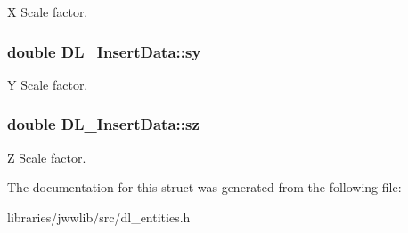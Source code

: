 X Scale factor. \hypertarget{structDL__InsertData_a163d354ac49b3c0d9c8b662dbdb8e714}{
\subsubsection[{sy}]{\setlength{\rightskip}{0pt plus 5cm}double D\-L\-\_\-\-Insert\-Data\-::sy}}\label{structDL__InsertData_a163d354ac49b3c0d9c8b662dbdb8e714}
Y Scale factor. \hypertarget{structDL__InsertData_a1327793a622ab705f4f09327fdc062f4}{
\subsubsection[{sz}]{\setlength{\rightskip}{0pt plus 5cm}double D\-L\-\_\-\-Insert\-Data\-::sz}}\label{structDL__InsertData_a1327793a622ab705f4f09327fdc062f4}
Z Scale factor. 

The documentation for this struct was generated from the following file\-:\begin{DoxyCompactItemize}
\item 
libraries/jwwlib/src/dl\-\_\-entities.\-h\end{DoxyCompactItemize}
